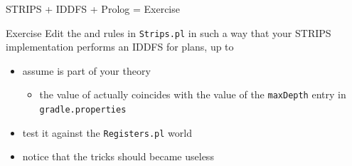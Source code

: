 \documentclass[presentation]{beamer}\mode<presentation>{\usetheme{AMSBolognaFC}}
\begin{document}
\begin{frame}[c]{STRIPS + IDDFS + Prolog = Exercise}
    
    \startExercise

    \begin{block}{Exercise \currentExercise}
        Edit the  and  rules in \texttt{Strips.pl} in such a way that your STRIPS implementation performs an IDDFS for plans, up to 
        \begin{itemize}
            \item assume  is part of your theory
            \begin{itemize}
                \item the value of  actually coincides with the value of the \texttt{maxDepth} entry in \texttt{gradle.properties}
            \end{itemize}

            \item test it against the \texttt{Registers.pl} world

            \item notice that the  tricks should became useless
        \end{itemize}
    \end{block}


\end{frame}

\section*{}

\frame{\titlepage}

\section*{\refname}

% 	
% 	

\end{document}

